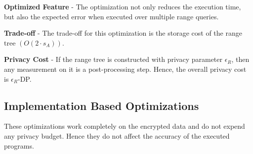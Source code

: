 


\squishlist
\item \textbf{Optimized Feature} - The optimization not only reduces the execution time, but also the expected error when executed over multiple range queries.
\item \textbf{Trade-off} - The trade-off for this optimization is the storage cost of the range tree $(O(2\cdot s_A))$.
\item \textbf{Privacy Cost} - If the range tree is constructed  with privacy parameter $\epsilon_R$, then any measurement on it is a post-processing step. Hence, the overall privacy cost is $\epsilon_R$-DP.
\squishend

\subsection{Implementation Based Optimizations} \label{sec:im_optimization}
These optimizations work completely on the encrypted data and do not expend any privacy budget. Hence they do not affect the accuracy of the executed programs.

